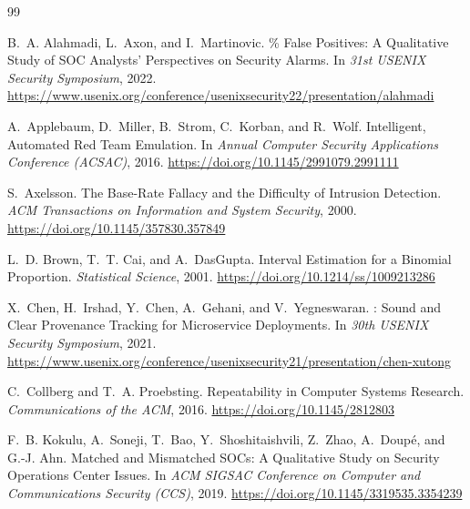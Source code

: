 \documentclass[11pt,a4paper]{article}
\begin{document}
\begin{thebibliography}{99}


B.~A. Alahmadi, L.~Axon, and I.~Martinovic.
\% False Positives: A Qualitative Study of {SOC} Analysts'
  Perspectives on Security Alarms.
\newblock In \emph{31st USENIX Security Symposium}, 2022.
\newblock \url{https://www.usenix.org/conference/usenixsecurity22/presentation/alahmadi}

A.~Applebaum, D.~Miller, B.~Strom, C.~Korban, and R.~Wolf.
\newblock Intelligent, Automated Red Team Emulation.
\newblock In \emph{Annual Computer Security Applications Conference (ACSAC)},
  2016.
\newblock \url{https://doi.org/10.1145/2991079.2991111}

S.~Axelsson.
\newblock The Base-Rate Fallacy and the Difficulty of Intrusion Detection.
\newblock \emph{ACM Transactions on Information and System Security}, 2000.
\newblock \url{https://doi.org/10.1145/357830.357849}

L.~D. Brown, T.~T. Cai, and A.~DasGupta.
\newblock Interval Estimation for a Binomial Proportion.
\newblock \emph{Statistical Science}, 2001.
\newblock \url{https://doi.org/10.1214/ss/1009213286}

X.~Chen, H.~Irshad, Y.~Chen, A.~Gehani, and V.~Yegneswaran.
: Sound and Clear Provenance Tracking for Microservice
  Deployments.
\newblock In \emph{30th USENIX Security Symposium}, 2021.
\newblock \url{https://www.usenix.org/conference/usenixsecurity21/presentation/chen-xutong}

C.~Collberg and T.~A. Proebsting.
\newblock Repeatability in Computer Systems Research.
\newblock \emph{Communications of the ACM}, 2016.
\newblock \url{https://doi.org/10.1145/2812803}

F.~B. Kokulu, A.~Soneji, T.~Bao, Y.~Shoshitaishvili, Z.~Zhao, A.~Doup\'e, and
  G.-J. Ahn.
\newblock Matched and Mismatched {SOCs}: A Qualitative Study on Security
  Operations Center Issues.
\newblock In \emph{ACM SIGSAC Conference on Computer and Communications
  Security (CCS)}, 2019.
\newblock \url{https://doi.org/10.1145/3319535.3354239}


\end{thebibliography}
\end{document}
